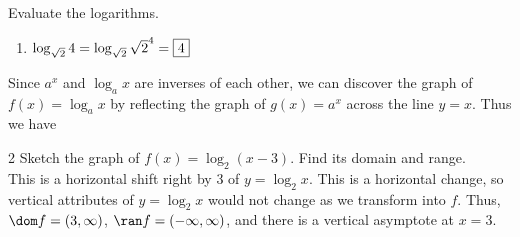 \documentclass{book}
\begin{document}
\begin{Exam} Evaluate the logarithms.
\begin{enumerate}
\item $\log_{\sqrt{2}} 4 = \log_{\sqrt{2}} \sqrt{2}^4 = \fbox{$4$}$
\end{enumerate}
\end{Exam}\vs

Since $a^x$ and $\log_ax$ are inverses of each other, we can discover the graph of $f(x) = \log_ax$ by reflecting the graph of $g(x) =a^x$ across the line $y=x$. Thus we have 

\begin{center}
\end{center}

\begin{Exam} 
 \begin{multicols}{2}
 Sketch the graph of $f(x) = \log_2(x-3)$. Find its domain and range.\\

This is a horizontal shift right by 3 of $y=\log_2 x$. This is a horizontal change, so vertical attributes of $y=\log_2 x$ would not change as we transform into $f$. Thus, $\dom f = (3,\infty)$, $\ran f = (-\infty, \infty)$, and there is a vertical asymptote at $x=3$.

\begin{center}
\end{center}
\end{multicols}
\end{Exam}\vs
\end{document}
